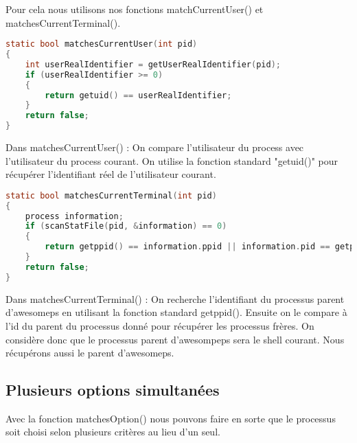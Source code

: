 Pour cela nous utilisons nos fonctions matchCurrentUser() et matchesCurrentTerminal().

\begin{lstlisting}[frame=single, language=c]
static bool matchesCurrentUser(int pid)
{
    int userRealIdentifier = getUserRealIdentifier(pid);
    if (userRealIdentifier >= 0)
    {
        return getuid() == userRealIdentifier;
    }
    return false;
}
\end{lstlisting}

Dans matchesCurrentUser() : On compare l'utilisateur du process avec l'utilisateur du process courant. On utilise la fonction standard "getuid()" pour récupérer l'identifiant réel de l'utilisateur courant.


\begin{lstlisting}[frame=single, language=c]
static bool matchesCurrentTerminal(int pid)
{
    process information;
    if (scanStatFile(pid, &information) == 0)
    {
        return getppid() == information.ppid || information.pid == getppid();
    }
    return false;
}
\end{lstlisting}

Dans matchesCurrentTerminal() : On recherche l'identifiant du processus parent d'awesomeps en utilisant la fonction standard getppid(). Ensuite on le compare à l'id du parent du processus donné pour récupérer les processus frères. On considère donc que le processus parent d'awesompeps sera le shell courant. Nous récupérons aussi le parent d'awesomeps.

\subsection{Plusieurs options simultanées} 

Avec la fonction matchesOption() nous pouvons faire en sorte que le processus soit choisi selon plusieurs critères au lieu d'un seul.